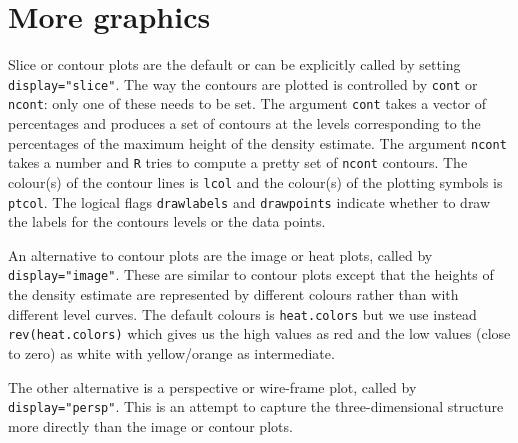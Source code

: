 \documentclass[a4paper,11pt]{article}
\begin{document}

\section{More graphics}
Slice or contour plots are the default or can be explicitly called by setting
\texttt{display="slice"}. The way the contours are plotted is controlled by
\texttt{cont} or \texttt{ncont}: only one of these needs to be set. 
The argument 
\texttt{cont} takes a vector of percentages and produces a set of contours
at the levels corresponding to the percentages of the maximum height of the 
density estimate. The argument 
\texttt{ncont} takes a number and \texttt{R} tries to 
compute a pretty set of \texttt{ncont} contours.  
The colour(s) of the contour lines is \texttt{lcol} and
the colour(s) of the plotting symbols is \texttt{ptcol}.
The logical flags \texttt{drawlabels} and \texttt{drawpoints} indicate
whether to draw the labels for the contours levels or the data points.

An alternative to contour plots are the image or heat plots,
called by \texttt{display="image"}.  These 
are similar to contour plots except that the heights of the density 
estimate are represented by different colours rather than with
different level curves. The default colours is \texttt{heat.colors}
but we use instead \texttt{rev(heat.colors)} which gives us the high 
values as red and the low values (close to zero) as white with
yellow/orange as intermediate. 

The other alternative is a perspective or wire-frame plot, 
called by \texttt{display="persp"}. This is an attempt
to capture the three-dimensional structure more directly than the 
image or contour plots.


\end{document}
